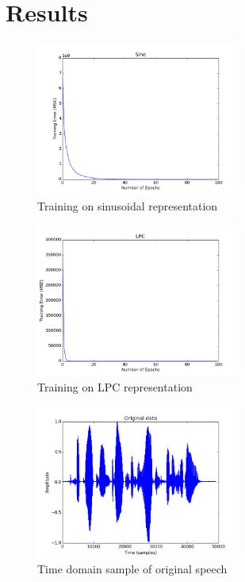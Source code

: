 \documentclass{article} %
\begin{document}
\section{Results}

\begin{figure}[h!]
    \centering
    \includegraphics[width=0.6\textwidth,height=0.5\textwidth]{sine_error.png}
    \caption{Training on sinusoidal representation}
    \label{fig:sine_error}
\end{figure}

\begin{figure}[h!]
    \centering
    \includegraphics[width=0.6\textwidth,height=0.5\textwidth]{lpc_error.png}
    \caption{Training on LPC representation}
    \label{fig:lpc_error}
\end{figure}

\begin{figure}[h!]
    \centering
    \includegraphics[width=0.6\textwidth,height=0.5\textwidth]{original_sample.png}
    \caption{Time domain sample of original speech}
    \label{fig:original_sample}
\end{figure}
\end{document}
